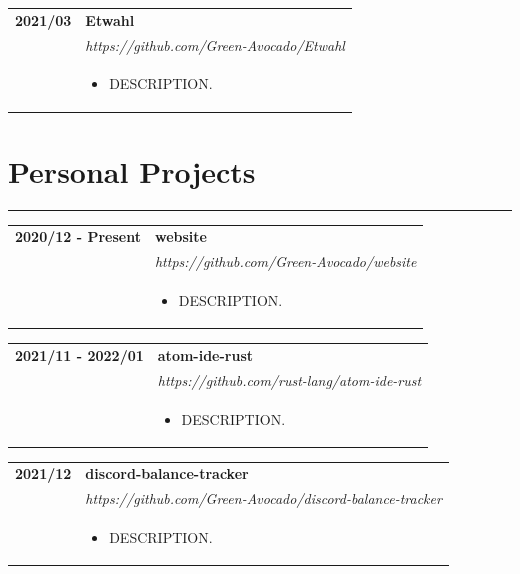 \documentclass[letterpaper]{article}
\newcommand{\sect}[1]{\section*{#1}
                        {\color{cyan}
                        \rule{\textwidth}{1pt}
                        \vspace{-1ex}}}
\begin{document}
        \begin{tabular}{p{} p{}} 
            \textbf{2021/03} & \textbf{Etwahl} \\
            & \emph{https://github.com/Green-Avocado/Etwahl} \\
            & \begin{itemize}
                \item DESCRIPTION.
            \end{itemize}
            \\
        \end{tabular}

    \sect{Personal Projects}

        \begin{tabular}{p{} p{}} 
            \textbf{2020/12 - Present} & \textbf{website} \\
            & \emph{https://github.com/Green-Avocado/website} \\
            & \begin{itemize}
                \item DESCRIPTION.
            \end{itemize}
            \\
        \end{tabular}

        \begin{tabular}{p{} p{}} 
            \textbf{2021/11 - 2022/01} & \textbf{atom-ide-rust} \\
            & \emph{https://github.com/rust-lang/atom-ide-rust} \\
            & \begin{itemize}
                \item DESCRIPTION.
            \end{itemize}
            \\
        \end{tabular}

        \begin{tabular}{p{} p{}} 
            \textbf{2021/12} & \textbf{discord-balance-tracker} \\
            & \emph{https://github.com/Green-Avocado/discord-balance-tracker} \\
            & \begin{itemize}
                \item DESCRIPTION.
            \end{itemize}
            \\
        \end{tabular}
\end{document}
